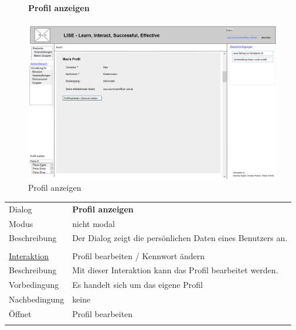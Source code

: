 \documentclass[12pt,a4paper]{article}
\begin{document}
{\begin{figure}[H]
	\centering
	\paragraph{Profil anzeigen}
	\includegraphics[width=\textwidth]{Bilder/Mockups/GUI/ProfilAnzeigen.png}
	\caption{Profil anzeigen}
	\label{ProfilAnzeigen}
\end{figure}
\begin{tabular}{l p{12cm}}
Dialog 	 & \textbf{Profil anzeigen} \\ 
Modus & nicht modal\\ 
Beschreibung   	 & Der Dialog zeigt die persönlichen Daten eines Benutzers an.\\\\

\underline{Interaktion} 	 & Profil bearbeiten / Kennwort ändern\\ 
Beschreibung   	 & Mit dieser Interaktion kann das Profil bearbeitet werden.\\
Vorbedingung	& Es handelt sich um das eigene Profil \\
Nachbedingung	& keine \\
Öffnet			& \glqq Profil bearbeiten\grqq \\\\
\end{tabular}\\\\

\begin{figure}[H]
	\centering

\end{figure}}
\end{document}
